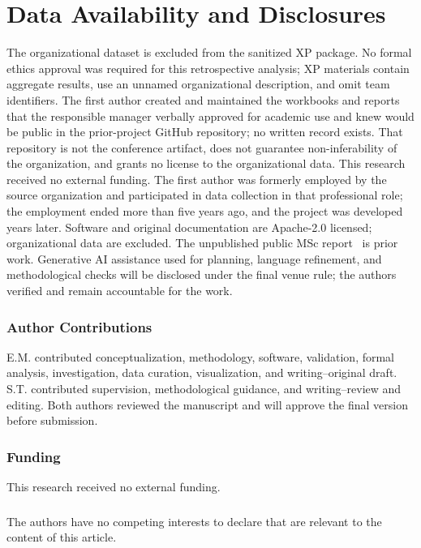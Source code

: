 \documentclass[runningheads]{llncs}
\begin{document}
\section*{Data Availability and Disclosures}

The organizational dataset is excluded from the sanitized XP package. No formal ethics approval was required for this retrospective analysis; XP materials contain aggregate results, use an unnamed organizational description, and omit team identifiers. The first author created and maintained the workbooks and reports that the responsible manager verbally approved for academic use and knew would be public in the prior-project GitHub repository; no written record exists. That repository is not the conference artifact, does not guarantee non-inferability of the organization, and grants no license to the organizational data. This research received no external funding. The first author was formerly employed by the source organization and participated in data collection in that professional role; the employment ended more than five years ago, and the project was developed years later. Software and original documentation are Apache-2.0 licensed; organizational data are excluded. The unpublished public MSc report~\cite{morabia2026project} is prior work. Generative AI assistance used for planning, language refinement, and methodological checks will be disclosed under the final venue rule; the authors verified and remain accountable for the work.

\begin{credits}
\subsubsection{Author Contributions}
E.M. contributed conceptualization, methodology, software, validation, formal analysis, investigation, data curation, visualization, and writing--original draft. S.T. contributed supervision, methodological guidance, and writing--review and editing. Both authors reviewed the manuscript and will approve the final version before submission.

\subsubsection{Funding}
This research received no external funding.

\subsubsection{\discintname}
The authors have no competing interests to declare that are relevant to the content of this article.
\end{credits}



\end{document}
